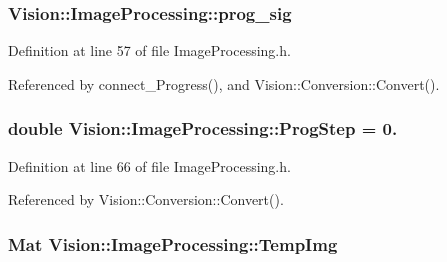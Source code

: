 \hypertarget{class_vision_1_1_image_processing_ac0c168e16365ff5941791f67ec895663}{}
\subsubsection[{prog\+\_\+sig}]{ Vision\+::\+Image\+Processing\+::prog\+\_\+sig\hspace{0.3cm}{\ttfamily [protected]}}\label{class_vision_1_1_image_processing_ac0c168e16365ff5941791f67ec895663}


Definition at line 57 of file Image\+Processing.\+h.



Referenced by connect\+\_\+\+Progress(), and Vision\+::\+Conversion\+::\+Convert().

\hypertarget{class_vision_1_1_image_processing_a7438451f9a447a33e9f04bf8e73eae31}{}
\subsubsection[{Prog\+Step}]{\setlength{\rightskip}{0pt plus 5cm}double Vision\+::\+Image\+Processing\+::\+Prog\+Step = 0.}\label{class_vision_1_1_image_processing_a7438451f9a447a33e9f04bf8e73eae31}


Definition at line 66 of file Image\+Processing.\+h.



Referenced by Vision\+::\+Conversion\+::\+Convert().

\hypertarget{class_vision_1_1_image_processing_a5371ad8d6f7aac9d43ee5c902ade7435}{}
\subsubsection[{Temp\+Img}]{\setlength{\rightskip}{0pt plus 5cm}Mat Vision\+::\+Image\+Processing\+::\+Temp\+Img\hspace{0.3cm}{\ttfamily [protected]}}\label{class_vision_1_1_image_processing_a5371ad8d6f7aac9d43ee5c902ade7435}


